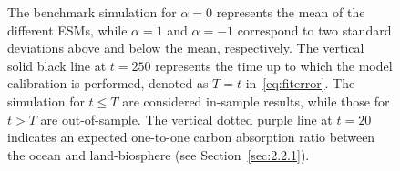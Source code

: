 \documentclass[11pt, a4paper, pdftex, twoside, dvipsnames]{article}
\renewcommand{\ref}{\cref}
\begin{document}
\begin{figure}[!htbp]
{%
The benchmark simulation for $\alpha=0$ represents the mean of the different ESMs, while $\alpha=1$ and $\alpha=-1$ correspond to two standard deviations above and below the mean, respectively.
%
The vertical solid black line at $t=250$ represents the time up to which the model calibration is performed, denoted as $T=t$ in~\eqref{eq:fiterror}.
%
The simulation for $t \leqslant T$ are considered in-sample results, while those for $t> T$ are out-of-sample.
%
The vertical dotted purple line at $t=20$ indicates an expected one-to-one carbon absorption ratio between the ocean and land-biosphere (see Section~\ref{sec:2.2.1}).
%
     }
    \label{fig:fully_fitted}
\end{figure}


%
\newpage
\end{document}
